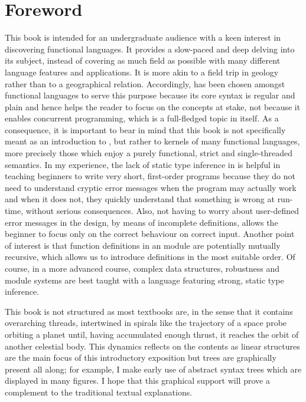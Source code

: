
\chapter*{Foreword}

This book is intended for an undergraduate audience with a keen
interest in discovering functional languages. It provides a
slow\hyp{}paced and deep delving into its subject, instead of covering
as much field as possible with many different language features and
applications. It is more akin to a field trip in geology rather than
to a geographical relation. Accordingly, \Erlang has been chosen
amongst functional languages to serve this purpose because its core
syntax is regular and plain and hence helps the reader to focus on the
concepts at stake, not because it enables concurrent programming,
which is a full\hyp{}fledged topic in itself. As a consequence, it is
important to bear in mind that this book is not specifically meant as
an introduction to \Erlang, but rather to kernels of many functional
languages, more precisely those which enjoy a purely functional,
strict and single\hyp{}threaded semantics. In my experience, the lack
of static type inference in \Erlang is helpful in teaching beginners
to write very short, first\hyp{}order programs because they do not
need to understand cryptic error messages when the program may
actually work and when it does not, they quickly understand that
something is wrong at run\hyp{}time, without serious
consequences. Also, not having to worry about user\hyp{}defined error
messages in the design, by means of incomplete definitions, allows the
beginner to focus only on the correct behaviour on correct
input. Another point of interest is that function definitions in an
\Erlang module are potentially mutually recursive, which allows us to
introduce definitions in the most suitable order. Of course, in a more
advanced course, complex data structures, robustness and module
systems are best taught with a language featuring strong, static type
inference.

This book is not structured as most textbooks are, in the sense that
it contains overarching threads, intertwined in spirals like the
trajectory of a space probe orbiting a planet until, having
accumulated enough thrust, it reaches the orbit of another celestial
body. This dynamics reflects on the contents as linear structures are
the main focus of this introductory exposition but trees are
graphically present all along; for example, I make early use of
abstract syntax trees which are displayed in many figures. I hope that
this graphical support will prove a complement to the traditional
textual explanations.

